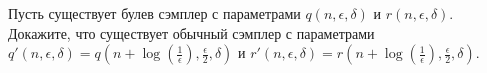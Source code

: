 Пусть существует булев сэмплер с параметрами $q(n, \epsilon, \delta)$ и $r(n, \epsilon, \delta)$. Докажите, что существует обычный
сэмплер с параметрами $q'(n, \epsilon, \delta) = q(n + \log(\frac{1}{\epsilon}), \frac{\epsilon}{2}, \delta)$ и $r'(n,
\epsilon, \delta) = r(n + \log(\frac{1}{\epsilon}), \frac{\epsilon}{2}, \delta)$. 